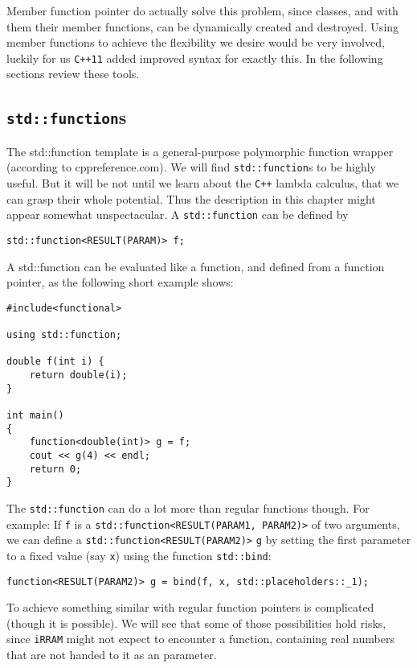 \documentclass{article}
\newcommand{\irram}{\texttt{iRRAM}\xspace}
\newcommand{\cc}{\texttt{C++}\xspace}
\newcommand{\ccOx}{\texttt{C++11}\xspace}
\newcommand{\code}[1]{\texttt{#1}}
\begin{document}
Member function pointer do actually solve this problem, since classes, and with them their member functions, can be dynamically created and destroyed. Using member functions to achieve the flexibility we desire would be very involved, luckily for us \ccOx added improved syntax for exactly this. In the following sections review these tools.

\subsection{\code{std::function}s}\label{sec: std::functions}

The std::function template is a general-purpose polymorphic function wrapper (according to cppreference.com). We will find \code{std::function}s to be highly useful. But it will be not until we learn about the \cc lambda calculus, that we can grasp their whole potential. Thus the description in this chapter might appear somewhat unspectacular. A \code{std::function} can be defined by
\begin{lstlisting}
std::function<RESULT(PARAM)> f;
\end{lstlisting}

A std::function can be evaluated like a function, and defined from a function pointer, as the following short example shows:
\begin{lstlisting}
#include<functional>

using std::function;

double f(int i) {
	return double(i);
}

int main()
{
	function<double(int)> g = f;
	cout << g(4) << endl;
	return 0;
}
\end{lstlisting}

The \code{std::function} can do a lot more than regular functions though. For example: If \code{f} is a \code{std::function<RESULT(PARAM1, PARAM2)>} of two arguments, we can define a \code{std::function<RESULT(PARAM2)>} \code{g} by setting the first parameter to a fixed value (say \code x) using the function \code{std::bind}:
\begin{lstlisting}
function<RESULT(PARAM2)> g = bind(f, x, std::placeholders::_1);
\end{lstlisting}
To achieve something similar with regular function pointers is complicated (though it is possible). We will see that some of those possibilities hold risks, since \irram might not expect to encounter a function, containing real numbers that are not handed to it as an parameter.
\end{document}
